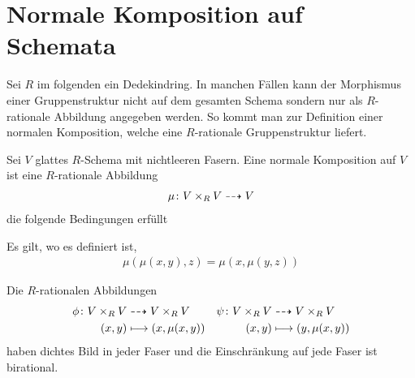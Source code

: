 
\section{Normale Komposition auf Schemata}
Sei $R$ im folgenden ein Dedekindring.
In manchen Fällen kann der Morphismus einer Gruppenstruktur nicht auf
dem gesamten Schema sondern nur als $R$-rationale Abbildung angegeben
werden. So kommt man zur Definition einer normalen Komposition, welche
eine $R$-rationale Gruppenstruktur liefert.
\begin{Definition}\label{def:normalekomposition}
  Sei $V$ glattes $R$-Schema mit nichtleeren Fasern.
  Eine normale Komposition auf $V$ ist eine $R$-rationale
  Abbildung
  \begin{gather*}
    \mu\colon V\times_R V\dashrightarrow V
  \end{gather*}
  die folgende Bedingungen erfüllt
  \begin{description}[font=\normalfont\itshape]
  \item[(Assoziativität)] Es gilt, wo es definiert ist,
    \begin{gather*}
      \mu(\mu(x,y),z)=\mu(x,\mu(y,z))
    \end{gather*}
  \item[(Inverses)]
    Die $R$-rationalen Abbildungen
    \begin{align*}
      \phi\colon V\times_R V
      &\dashrightarrow V\times_R V
      &\psi\colon V\times_R V
      & \dashrightarrow V\times_R V\\
      (x,y)
      &\longmapsto (x,\mu(x,y))
      &(x,y)
      &\longmapsto (y,\mu(x,y))       
    \end{align*}
    haben dichtes Bild in jeder Faser und die Einschränkung auf jede
    Faser ist birational.
  \end{description}
\end{Definition}

